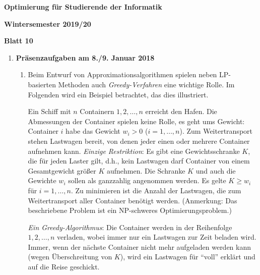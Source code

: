 \documentclass[11pt, a4paper]{article}
\begin{document}
\begin{center}
\begin{Large}
\textbf{Optimierung für Studierende der Informatik}
\end{Large}

\textbf{}
	
\vspace{0.5cm}

\textbf{Wintersemester 2019/20}

\textbf{Blatt 10}

\vspace{0.5cm}
\end{center}

\small

\begin{enumerate}[\bfseries A:]


\item \textbf{Präsenzaufgaben am 8./9. Januar 2018}

\begin{enumerate}[\bfseries 1.]

\item Beim Entwurf von Approximationsalgorithmen spielen neben LP-basierten Methoden auch \textit{Greedy-Verfahren} eine wichtige Rolle. Im Folgenden wird ein Beispiel betrachtet, das dies illustriert.

\medskip

Ein Schiff mit $n$ Containern $1,2,\ldots,n$ erreicht den Hafen. Die Abmessungen der Container spielen keine Rolle, es geht ums Gewicht: Container $i$ habe das Gewicht $w_i > 0$ ($i=1,\ldots,n$). Zum Weitertransport stehen Lastwagen bereit, von denen jeder einen oder mehrere Container aufnehmen kann. \textit{Einzige Restriktion}: Es gibt eine Gewichtsschranke $K$, die für jeden Laster gilt, d.h., kein Lastwagen darf Container von einem Gesamtgewicht größer $K$ aufnehmen. Die Schranke $K$ und auch die Gewichte $w_i$ sollen als ganzzahlig angenommen werden. Es gelte $K \geq w_i$ für $i=1,\ldots,n$. Zu minimieren ist die Anzahl der Lastwagen, die zum Weitertransport aller Container benötigt werden. (Anmerkung: Das beschriebene Problem ist ein NP-schweres Optimierungsproblem.)

\textit{Ein Greedy-Algorithmus}: Die Container werden in der Reihenfolge $1,2,\ldots, n$ verladen, wobei immer nur ein Lastwagen zur Zeit beladen wird. Immer, wenn der nächste Container nicht mehr aufgeladen werden kann (wegen Überschreitung von $K$), wird ein Lastwagen für \enquote{voll} erklärt und auf die Reise geschickt.


\end{enumerate}
\end{enumerate}
\end{document}
